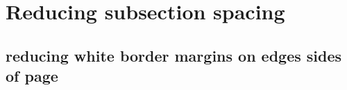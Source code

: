 \section{Reducing subsection spacing}


\subsection{reducing white border margins on edges sides of page}

